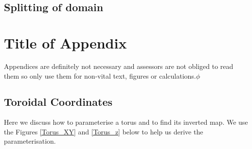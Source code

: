 \documentclass[12pt,a4paper]{article}
\begin{document}
\subsection{Splitting of domain}

\printbibliography[heading=bibintoc]

\appendix

\section{Title of Appendix}

Appendices are definitely not necessary and assessors are not obliged to read them so only use them for non-vital text, figures or calculations.$\phi$

\subsection{Toroidal Coordinates}
Here we discuss how to parameterise a torus and to find its inverted map. We use the Figures \ref{Torus_XY} and \ref{Torus_z} below to help us derive the parameterisation.
\end{document}
